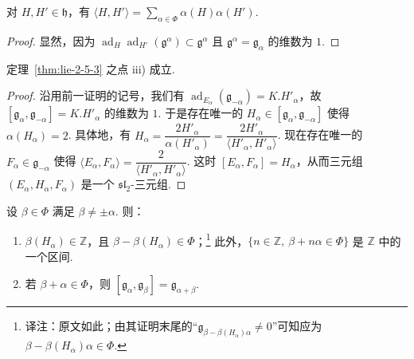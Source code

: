 \begin{corollary*}
对 $H,H'\in\mathfrak h$，有 $\langle H,H'\rangle=\sum_{\alpha\in\Phi}\alpha(H)\alpha(H')$.
\end{corollary*}
\begin{proof}
显然，因为 $\operatorname{ad}_{H}\operatorname{ad}_{H'}(\mathfrak g^{\alpha})\subset\mathfrak g^{\alpha}$ 且 $\mathfrak g^{\alpha}=\mathfrak g_{\alpha}$ 的维数为 $1$.
\end{proof}
\begin{corollary*}
定理~\ref{thm:lie-2-5-3} 之点 iii) 成立.
\end{corollary*}
\begin{proof}
沿用前一证明的记号，我们有 $\operatorname{ad}_{E_{\alpha}}(\mathfrak g_{-\alpha})=K.H'_{\alpha}$，故 $[\mathfrak g_{\alpha},\mathfrak g_{-\alpha}]=K.H'_{\alpha}$ 的维数为 $1$. 于是存在唯一的 $H_{\alpha}\in[\mathfrak g_{\alpha},\mathfrak g_{-\alpha}]$ 使得 $\alpha(H_{\alpha})=2$. 具体地，有 $H_{\alpha}=\dfrac{2H'_{\alpha}}{\alpha(H'_{\alpha})}=\dfrac{2H'_{\alpha}}{\langle H'_{\alpha},H'_{\alpha}\rangle}$. 现在存在唯一的 $F_{\alpha}\in\mathfrak g_{-\alpha}$ 使得 $\langle E_{\alpha},F_{\alpha}\rangle=\dfrac{2}{\langle H'_{\alpha},H'_{\alpha}\rangle}$. 这时 $[E_{\alpha},F_{\alpha}]=H_{\alpha}$，从而三元组 $(E_{\alpha},H_{\alpha},F_{\alpha})$ 是一个 $\mathfrak{sl}_{2}$-三元组.
\end{proof}
\begin{proposition}\label{prop:lie-2-5-6}
设 $\beta\in\Phi$ 满足 $\beta\neq\pm\alpha$. 则：
\begin{enumerate}[label=\roman*)]
\item $\beta(H_{\alpha})\in\mathbb Z$，且 $\beta-\beta(H_{\alpha})\in\Phi$；\footnote{译注：原文如此；由其证明末尾的``$\mathfrak g_{\beta-\beta(H_{\alpha})\alpha}\neq0$''可知应为 $\beta-\beta(H_{\alpha})\alpha\in\Phi$.}
此外，$\{n\in\mathbb Z,\ \beta+n\alpha\in\Phi\}$ 是 $\mathbb Z$ 中的一个区间.
\item 若 $\beta+\alpha\in\Phi$，则 $[\mathfrak g_{\alpha},\mathfrak g_{\beta}]=\mathfrak g_{\alpha+\beta}$.
\end{enumerate}
\end{proposition}
